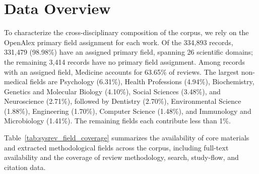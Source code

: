 \section*{Data Overview}

To characterize the cross-disciplinary composition of the corpus, we rely on the OpenAlex primary field assignment for each work. Of the 334,893 records, 331,479 (98.98\%) have an assigned primary field, spanning 26 scientific domains; the remaining 3,414 records have no primary field assignment. Among records with an assigned field, Medicine accounts for 63.65\% of reviews. The largest non-medical fields are Psychology (6.31\%), Health Professions (4.94\%), Biochemistry, Genetics and Molecular Biology (4.10\%), Social Sciences (3.48\%), and Neuroscience (2.71\%), followed by Dentistry (2.70\%), Environmental Science (1.88\%), Engineering (1.70\%), Computer Science (1.48\%), and Immunology and Microbiology (1.41\%). The remaining fields each contribute less than 1\%. 

Table~\ref{tab:sysrev_field_coverage} summarizes the availability of core materials and extracted methodological fields across the corpus, including full-text availability and the coverage of review methodology, search, study-flow, and citation data.



